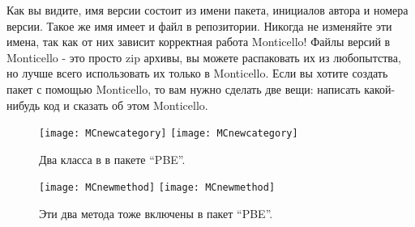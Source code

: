 \documentclass[a4paper,10pt,twoside]{book}
\begin{document}
Как вы видите, имя версии состоит из имени пакета, инициалов автора и номера версии. Такое же имя имеет и файл в репозитории. Никогда не изменяйте эти имена, так как от них зависит корректная работа Monticello! Файлы версий в Monticello - это просто zip архивы, вы можете распаковать их из любопытства, но лучше всего использовать их только в Monticello. Если вы хотите создать пакет с помощью Monticello, то вам нужно сделать две вещи: написать какой-нибудь код и сказать об этом Monticello.



\begin{figure}[btp]
	\begin{center}
	\ifluluelse
		{\texttt{[image: MCnewcategory]}}
		{\texttt{[image: MCnewcategory]}}
	\end{center}
	\caption{Два класса в в пакете ``PBE''.}
\end{figure}

\begin{figure}[btp]
	\begin{center}
	\ifluluelse
		{\texttt{[image: MCnewmethod]}}
		{\texttt{[image: MCnewmethod]}}
	\end{center}
	\caption{Эти два метода тоже включены в пакет ``PBE''.}
\end{figure}

\end{document}
